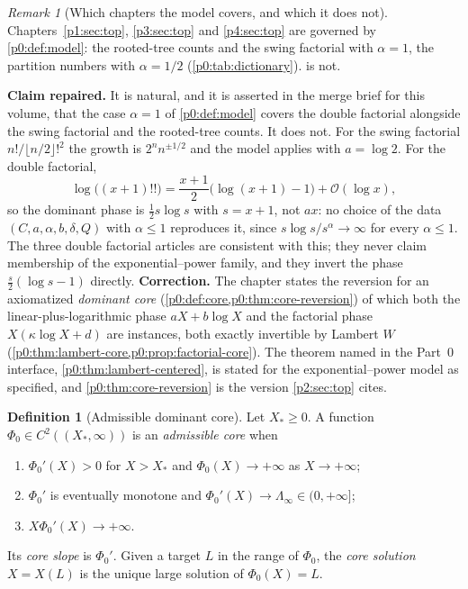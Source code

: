 \documentclass[11pt,a4paper,oneside]{book}
\theoremstyle{plain}
\theoremstyle{definition}
\newtheorem{definition}[theorem]{Definition}
\theoremstyle{remark}
\newtheorem{remark}[theorem]{Remark}
\newcommand{\bigO}{\mathcal{O}}
\newcommand{\Wlam}{W}
\begin{document}
\begin{remark}[Which chapters the model covers, and which it does not]
\label{p0:rem:model-scope}
Chapters~\ref{p1:sec:top}, \ref{p3:sec:top} and \ref{p4:sec:top} are governed by
\cref{p0:def:model}: the rooted-tree counts and the swing factorial with
$\alpha=1$, the partition numbers with $\alpha=1/2$
(\cref{p0:tab:dictionary}).   is not.
\end{remark}

\begin{repairbox}
\textbf{Claim repaired.}  It is natural, and it is asserted in the merge brief
for this volume, that the case $\alpha=1$ of \cref{p0:def:model} covers the
double factorial alongside the swing factorial and the rooted-tree counts.
It does not.  For the swing factorial
$n!/\lfloor n/2\rfloor!^{2}$ the growth is $2^{n}n^{\pm1/2}$ and the model
applies with $a=\log 2$.  For the double factorial,
\[
 \log\bigl((x+1)!!\bigr)=\frac{x+1}{2}\bigl(\log(x+1)-1\bigr)+\bigO(\log x),
\]
so the dominant phase is $\tfrac12s\log s$ with $s=x+1$, not $ax$: no choice of
the data $(C,a,\alpha,b,\delta,Q)$ with $\alpha\le1$ reproduces it, since
$s\log s/s^{\alpha}\to\infty$ for every $\alpha\le1$.  The three double
factorial articles are consistent with this; they never claim membership of the
exponential--power family, and they invert the phase
$\tfrac{s}{2}(\log s-1)$ directly.
\textbf{Correction.}  The chapter states the reversion for an axiomatized
\emph{dominant core} (\cref{p0:def:core,p0:thm:core-reversion}) of which both
the linear-plus-logarithmic phase $aX+b\log X$ and the factorial phase
$X(\kappa\log X+d)$ are instances, both exactly invertible by Lambert $\Wlam$
(\cref{p0:thm:lambert-core,p0:prop:factorial-core}).  The theorem named in the
Part~0 interface, \cref{p0:thm:lambert-centered}, is stated for the
exponential--power model as specified, and \cref{p0:thm:core-reversion} is the
version \cref{p2:sec:top} cites.
\end{repairbox}

\begin{definition}[Admissible dominant core]\label{p0:def:core}
Let $X_\ast\ge0$.  A function $\Phi_0\in C^{2}((X_\ast,\infty))$ is an
\emph{admissible core} when
\begin{enumerate}
\item $\Phi_0'(X)>0$ for $X>X_\ast$ and $\Phi_0(X)\to+\infty$ as
      $X\to+\infty$;
\item $\Phi_0'$ is eventually monotone and $\Phi_0'(X)\to\Lambda_\infty\in(0,+\infty]$;
\item $X\Phi_0'(X)\to+\infty$.
\end{enumerate}
Its \emph{core slope} is $\Phi_0'$.  Given a target $L$ in the range of
$\Phi_0$, the \emph{core solution} $X=X(L)$ is the unique large solution of
$\Phi_0(X)=L$.
\end{definition}
\end{document}
